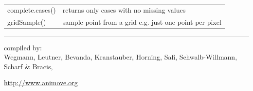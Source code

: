 \documentclass[a4paper,10pt,landscape]{article}
\begin{document}
\begin{multicols}{3}
\begin{tabular}{@{}p{\the\MyLen}%
                @{}p{\linewidth-\the\MyLen}@{}}
complete.cases() &  returns only cases with no missing values \\                
gridSample() & sample point from a grid e.g. just one point per pixel \\




\end{tabular}




\scriptsize

\rule{0.32\textwidth}{0.4pt}

compiled by:\\ Wegmann, Leutner, Bevanda, Kranstauber, Horning, Safi, Schwalb-Willmann, Scharf  \& Bracis, \THEYEAR	

\url{http://www.animove.org}









\end{multicols}
\end{document}
